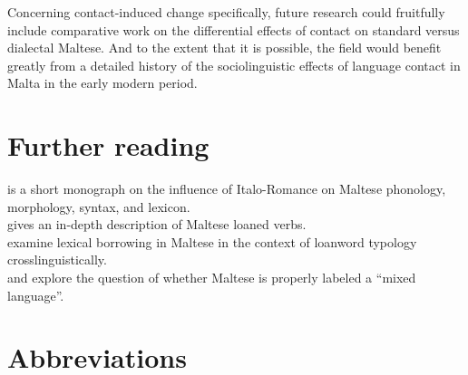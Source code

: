 \documentclass[output=paper]{langsci/langscibook}
\begin{document}
Concerning contact-induced change specifically, future research could fruitfully include comparative work on the differential effects of contact on standard versus dialectal Maltese. And to the extent that it is possible, the field would benefit greatly from a detailed history of the sociolinguistic effects of language contact in Malta in the early modern period.

\section*{Further reading}
\cite{krier1976} is a short monograph on the influence of Italo-Romance on Maltese phonology, morphology, syntax, and lexicon. \\
\cite{mifsudloanverbs} gives an in-depth description of Maltese loaned verbs. \\
\cite{comriespagnol2016} examine lexical borrowing in Maltese in the context of loanword typology crosslinguistically. \\
\cite{Drewes1994} and \cite{stolz2003} explore the question of whether Maltese is properly labeled a ``mixed language''.
\section*{Abbreviations}
\end{document}
